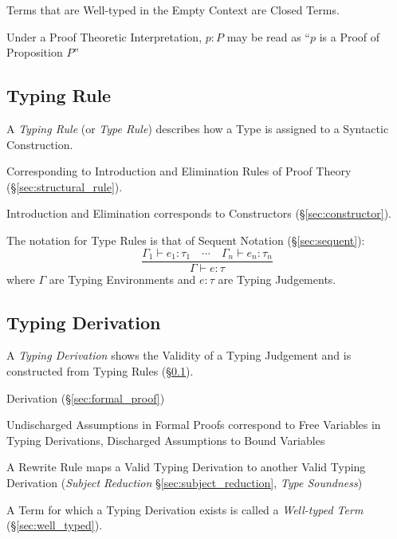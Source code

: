 Terms that are Well-typed in the Empty Context are Closed Terms.

Under a Proof Theoretic Interpretation, $p : P$ may be read as ``$p$
is a Proof of Proposition $P$''



\subsection{Typing Rule}\label{sec:typing_rule}

A \emph{Typing Rule} (or \emph{Type Rule}) describes how a Type is
assigned to a Syntactic Construction.

Corresponding to Introduction and Elimination Rules of Proof Theory
(\S\ref{sec:structural_rule}).

Introduction and Elimination corresponds to Constructors
(\S\ref{sec:constructor}).

The notation for Type Rules is that of Sequent Notation
(\S\ref{sec:sequent}):
\[
  {
    \frac
    { \Gamma_1 \vdash e_1:\tau_1 \quad \cdots
      \quad \Gamma_n \vdash e_n:\tau_n }
    { \Gamma \vdash e:\tau }
  }
\]
where $\Gamma$ are Typing Environments and $e:\tau$ are Typing
Judgements.



\subsection{Typing Derivation}\label{sec:typing_derivation}

A \emph{Typing Derivation} shows the Validity of a Typing Judgement
and is constructed from Typing Rules (\S\ref{sec:typing_rule}).

Derivation (\S\ref{sec:formal_proof})

Undischarged Assumptions in Formal Proofs correspond to Free Variables
in Typing Derivations, Discharged Assumptions to Bound Variables

A Rewrite Rule maps a Valid Typing Derivation to another Valid Typing
Derivation (\emph{Subject Reduction} \S\ref{sec:subject_reduction},
\emph{Type Soundness}) \cite{wadler14}

A Term for which a Typing Derivation exists is called a
\emph{Well-typed Term} (\S\ref{sec:well_typed}).



